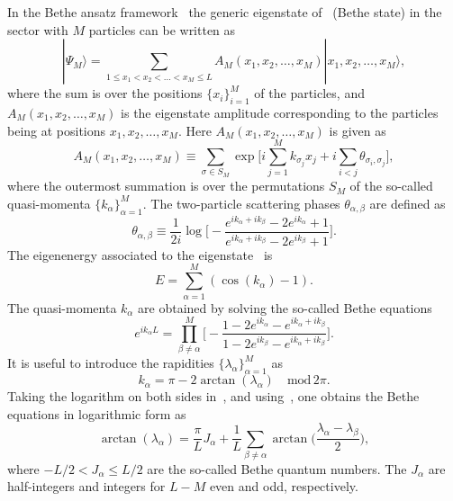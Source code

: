 \documentclass[11pt]{iopart}
\begin{document}
In the Bethe ansatz framework~\cite{bethe-1931,taka-book} the generic eigenstate 
of~ (Bethe state) in the sector with $M$ particles can be written as 
%
\begin{equation}
\label{ba-eig}
|\Psi_M\rangle=\sum\limits_{1\le x_1<x_2<\dots<x_M\le L}A_M(x_1,x_2,
\dots,x_M)|x_1,x_2,\dots,x_M\rangle,
\end{equation}
%
where the sum is over the positions $\{x_i\}_{i=1}^M$ of the particles, and $A_M(x_1,
x_2,\dots,x_M)$ is the eigenstate amplitude corresponding to the particles 
being at positions $x_1,x_2,\dots, x_M$. Here $A_M(x_1,x_2,\dots, x_M)$ is 
given as 
%
\begin{equation}
\label{ba_amp}
A_M(x_1,x_2,\dots,x_M)\equiv\sum\limits_{\sigma\in S_M}\exp\Big[i
\sum\limits_{j=1}^Mk_{\sigma_j}x_j+i\sum\limits_{i<j}\theta_{\sigma_i,\sigma_j}
\Big], 
\end{equation}
%
where the outermost summation is over the permutations $S_M$ of the so-called 
quasi-momenta $\{k_\alpha\}_{\alpha=1}^M$. The two-particle scattering phases 
$\theta_{\alpha,\beta}$ are defined as 
%
\begin{equation}
\label{s_phases}
\theta_{\alpha,\beta}\equiv \frac{1}{2i}\log\Big[-\frac{e^{ik_\alpha+ik_\beta}-
2e^{ik_\alpha}+1}{e^{ik_\alpha+ik_\beta}-2e^{ik_\beta}+1}\Big].
\end{equation}
%
The eigenenergy associated to the eigenstate~ is  
%
\begin{equation}
\label{ba-ener}
E=\sum\limits_{\alpha=1}^M(\cos(k_\alpha)-1). 
\end{equation}
%
The quasi-momenta $k_\alpha$ are obtained by solving the so-called Bethe 
equations~\cite{bethe-1931}
%
\begin{equation}
\label{ba-eq}
e^{ik_\alpha L}=\prod\limits^M_{\beta\ne\alpha}\Big[-\frac{1-2e^{
ik_\alpha}-e^{ik_\alpha+ik_\beta}}{1-2e^{ik_\beta}-e^{ik_\alpha+
ik_\beta}}\Big].
\end{equation}
%
It is useful to  introduce the rapidities $\{\lambda_\alpha\}_{\alpha=1}^M$ as 
%
\begin{equation}
\label{rap}
k_\alpha=\pi-2\arctan(\lambda_\alpha)\quad\mbox{mod}\, 2\pi.
\end{equation}
%
Taking the logarithm on both sides in~, and using~, 
one obtains the Bethe equations in logarithmic form as 
%
\begin{equation}
\label{ba-eq-log}
\arctan(\lambda_\alpha)=\frac{\pi}{L}J_\alpha+\frac{1}{L}\sum\limits_{
\beta\ne\alpha}\arctan\Big(\frac{\lambda_\alpha-\lambda_\beta}{2}\Big),
\end{equation}
%
where $-L/2<J_\alpha\le L/2$ are the so-called Bethe quantum numbers. The 
$J_\alpha$ are half-integers and integers for $L-M$ even and odd, 
respectively. 
\end{document}
